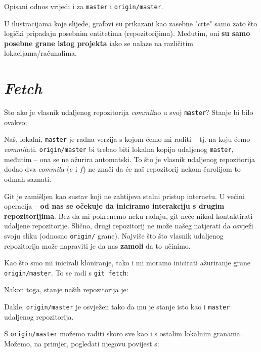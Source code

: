 

Opisani odnos vrijedi i za \verb+master+ i \verb+origin/master+.

U ilustracijama koje slijede, grafovi su prikazani kao zasebne "crte" samo zato što logički pripadaju posebnim entitetima (repozitorijima).
Međutim, oni \textbf{su samo posebne grane istog projekta} iako se nalaze na različitim lokacijama/računalima.

\section*{\emph{Fetch}}

Što ako je vlasnik udaljenog repozitorija \emph{commit}ao u svoj \verb+master+?
Stanje bi bilo ovakvo:



Naš, lokalni, \verb+master+ je radna verzija s kojom ćemo mi raditi -- tj. na koju ćemo \emph{commit}ati.
\verb+origin/master+ bi trebao biti lokalna kopija udaljenog \verb+master+, međutim -- ona se ne ažurira automatski.
To što je vlasnik udaljenog repozitorija dodao dva \emph{commit}a ($e$ i $f$) ne znači da će naš repozitorij nekom čarolijom to odmah saznati.

Git je zamišljen kao sustav koji ne zahtijeva stalni pristup internetu.
U većini operacija -- \textbf{od nas se očekuje da iniciramo interakciju s drugim repozitorijima}.
Bez da mi pokrenemo neku radnju, git neće nikad kontaktirati udaljene repozitorije.
Slično, drugi repozitorij ne može našeg natjerati da osvježi svoju sliku (odnosno \verb+origin/+ grane).
Najviše što što vlasnik udaljenog repozitorija može napraviti je da nas \textbf{zamoli} da to učinimo.

Kao što smo mi inicirali kloniranje, tako i mi moramo inicirati ažuriranje grane \verb+origin/master+.
To se radi s \verb+git fetch+:



Nakon toga, stanje naših repozitorija je:



Dakle, \verb+origin/master+ je osvježen tako da mu je stanje isto kao i \verb+master+ udaljenog repozitorija.

S \verb+origin/master+ možemo raditi skoro sve kao i s ostalim lokalnim granama.
Možemo, na primjer, pogledati njegovu povijest s:


